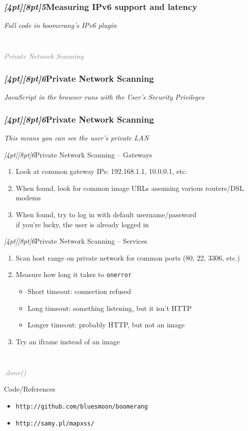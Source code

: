 \documentclass{beamer}
\newcommand{\sn}[1]{\textrm{\textit{\Huge{\raisebox{-3pt}[4pt][8pt]{\textcolor{f2elblue}{#1}}}}}\hspace{4pt}}
\newcommand{\innersplash}[1]{
  \begin{center}
    \large \textrm{\textit{ #1 } }
  \end{center}
}
\newcommand{\splashslide}[2][{}]{
  \begin{frame}
  \frametitle{#1}
  \innersplash{#2}
  \end{frame}
}
\newcommand{\leadinslide}[2]{
  \splashslide{
     {\fontsize{150}{20}\selectfont{\raisebox{0pt}[90pt][0pt]{\textcolor{light-gray}{#1}}}} \\ \huge \textcolor{gray}{#2}
  }
}
\begin{document}
\splashslide[\sn{5}Measuring IPv6 support and latency]{ Full code in boomerang's IPv6 plugin }

\leadinslide{6}{Private Network Scanning}

\splashslide[\sn{6}Private Network Scanning]{JavaScript in the browser runs with the User's Security Privileges}

\splashslide[\sn{6}Private Network Scanning]{This means you can see the user's private LAN}

\begin{frame}{\sn{6}Private Network Scanning -- Gateways}
  \begin{enumerate}
    \item Look at common gateway IPs: 192.168.1.1, 10.0.0.1, etc.
    \item When found, look for common image URLs assuming various routers/DSL modems
    \item When found, try to log in with default username/password \\ if you're lucky, the user is already logged in
  \end{enumerate}
\end{frame}

\begin{frame}{\sn{6}Private Network Scanning -- Services}
  \begin{enumerate}
    \item Scan host range on private network for common ports (80, 22, 3306, etc.)
    \item Measure how long it takes to \texttt{onerror}
    \begin{itemize}
      \item Short timeout: connection refused
      \item Long timeout: something listening, but it isn't HTTP
      \item Longer timeout: probably HTTP, but not an image
    \end{itemize}
    \item Try an iframe instead of an image
  \end{enumerate}
\end{frame}

\leadinslide{--}{.done()}

\begin{frame}{Code/References}
  \begin{itemize}
    \item \texttt{http://github.com/bluesmoon/boomerang}
    \item \texttt{http://samy.pl/mapxss/}
  \end{itemize}
\end{frame}
\end{document}
